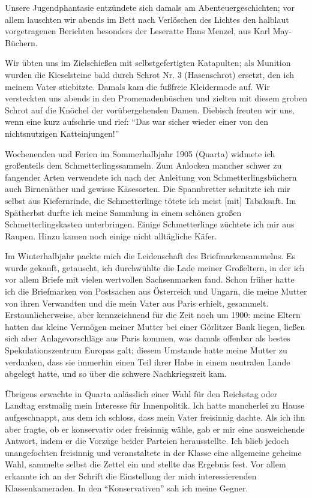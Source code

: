 Unsere Jugendphantasie entzündete sich damals am Abenteuergeschichten; vor allem lauschten wir abends im Bett nach Verlöschen des Lichtes den halblaut vorgetragenen Berichten besonders der Leseratte Hans Menzel, aus Karl May-Büchern.

Wir übten uns im Zielschießen mit selbstgefertigten Katapulten; als Munition wurden die Kieselsteine bald durch Schrot Nr. 3 (Hasenschrot) ersetzt, den ich meinem Vater stiebitzte. Damals kam die fußfreie Kleidermode auf. Wir versteckten uns abends in den Promenadenbüschen und zielten mit diesem groben Schrot auf die Knöchel der vorübergehenden Damen. Diebisch freuten wir uns, wenn eine kurz aufschrie und rief: \enquote{Das war sicher wieder einer von den nichtsnutzigen Katteinjungen!}

Wochenenden und Ferien im Sommerhalbjahr 1905 (Quarta) widmete ich großenteils dem Schmetterlingssammeln. Zum Anlocken mancher schwer zu fangender Arten verwendete ich nach der Anleitung von Schmetterlingsbüchern auch Birnenäther und gewisse Käsesorten. Die Spannbretter schnitzte ich mir selbst aus Kiefernrinde, die Schmetterlinge tötete ich meist [mit] Tabaksaft. Im Spätherbst durfte ich meine Sammlung in einem schönen großen Schmetterlingskasten unterbringen. Einige Schmetterlinge züchtete ich mir aus Raupen. Hinzu kamen noch einige nicht alltägliche Käfer.

Im Winterhalbjahr packte mich die Leidenschaft des Briefmarkensammelns. Es wurde gekauft, getauscht, ich durchwühlte die Lade meiner Großeltern, in der ich vor allem Briefe mit vielen wertvollen Sachsenmarken fand. Schon früher hatte ich die Briefmarken von Postsachen aus Österreich und Ungarn, die meine Mutter von ihren Verwandten und die mein Vater aus Paris erhielt, gesammelt. Erstaunlicherweise, aber kennzeichnend für die Zeit noch um 1900: meine Eltern hatten das kleine Vermögen meiner Mutter bei einer Görlitzer Bank liegen, ließen sich aber Anlagevorschläge aus Paris kommen, was damals offenbar als bestes Spekulationszentrum Europas galt; diesem Umstande hatte meine Mutter zu verdanken, dass sie immerhin einen Teil ihrer Habe in einem neutralen Lande abgelegt hatte, und so über die schwere Nachkriegszeit kam.

Übrigens erwachte in Quarta anlässlich einer Wahl für den Reichstag oder Landtag erstmalig mein Interesse für Innenpolitik. Ich hatte mancherlei zu Hause aufgeschnappt, aus dem ich schloss, dass mein Vater freisinnig dachte. Als ich ihn aber fragte, ob er konservativ oder freisinnig wähle, gab er mir eine ausweichende Antwort, indem er die Vorzüge beider Parteien herausstellte. Ich blieb jedoch unangefochten freisinnig und veranstaltete in der Klasse eine allgemeine geheime Wahl, sammelte selbst die Zettel ein und stellte das Ergebnis fest. Vor allem erkannte ich an der Schrift die Einstellung der mich interessierenden Klassenkameraden. In den \enquote{Konservativen} sah ich meine Gegner.

